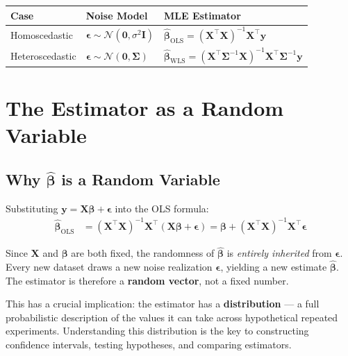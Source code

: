 \documentclass[12pt,a4paper]{article}
\begin{document}
\begin{center}
\begin{tabular}{lll}
\toprule
\textbf{Case} & \textbf{Noise Model} & \textbf{MLE Estimator} \\
\midrule
Homoscedastic & $\boldsymbol{\epsilon} \sim \mathcal{N}(\mathbf{0}, \sigma^2\mathbf{I})$
              & $\hat{\boldsymbol{\beta}}_{\mathrm{OLS}} = (\mathbf{X}^\top\mathbf{X})^{-1}\mathbf{X}^\top\mathbf{y}$ \\[0.4em]
Heteroscedastic & $\boldsymbol{\epsilon} \sim \mathcal{N}(\mathbf{0}, \boldsymbol{\Sigma})$
                & $\hat{\boldsymbol{\beta}}_{\mathrm{WLS}} = (\mathbf{X}^\top\boldsymbol{\Sigma}^{-1}\mathbf{X})^{-1}\mathbf{X}^\top\boldsymbol{\Sigma}^{-1}\mathbf{y}$ \\
\bottomrule
\end{tabular}
\end{center}

\section{The Estimator as a Random Variable}

\subsection{Why \texorpdfstring{$\hat{\boldsymbol{\beta}}$}{beta-hat} is a Random Variable}

Substituting $\mathbf{y} = \mathbf{X}\boldsymbol{\beta} + \boldsymbol{\epsilon}$ into the OLS formula:
\begin{align}
    \hat{\boldsymbol{\beta}}_{\mathrm{OLS}}
    &= (\mathbf{X}^\top\mathbf{X})^{-1}\mathbf{X}^\top(\mathbf{X}\boldsymbol{\beta} + \boldsymbol{\epsilon})
     = \boldsymbol{\beta} + (\mathbf{X}^\top\mathbf{X})^{-1}\mathbf{X}^\top\boldsymbol{\epsilon}
\end{align}

Since $\mathbf{X}$ and $\boldsymbol{\beta}$ are both fixed, the randomness of $\hat{\boldsymbol{\beta}}$
is \emph{entirely inherited} from $\boldsymbol{\epsilon}$. Every new dataset draws a new
noise realization $\boldsymbol{\epsilon}$, yielding a new estimate $\hat{\boldsymbol{\beta}}$.
The estimator is therefore a \textbf{random vector}, not a fixed number.

This has a crucial implication: the estimator has a \textbf{distribution} --- a full
probabilistic description of the values it can take across hypothetical repeated
experiments. Understanding this distribution is the key to constructing confidence
intervals, testing hypotheses, and comparing estimators.
\end{document}
